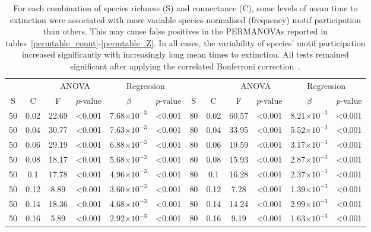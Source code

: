 \documentclass[12pt]{article}
\begin{document}
		\begin{table}[hb!]
			\caption{For each combination of species richness (S) and connectance (C), some levels of mean time to extinction were associated with more variable species-normalised (frequency) motif participation than others. This may cause false positives in the PERMANOVAs reported in tables~\ref{permtable_count}-\ref{permtable_Z}. In all cases, the variability of species' motif participation increased significantly with increasingly long mean times to extinction. All tests remained significant after applying the correlated Bonferroni correction~\citep{Drezner2016}.}
			\label{betadisp_freq}
			\footnotesize
			\begin{tabular}{c c | c c| c c ||c c | c c | c c |}
        &&\multicolumn{2}{c|}{ANOVA}&\multicolumn{2}{c||}{Regression}&&&\multicolumn{2}{c|}{ANOVA}&\multicolumn{2}{c|}{Regression}\\
        S&C&F&$p$-value&$\beta$&$p$-value&S&C&F&$p$-value&$\beta$&$p$-value\\
        \hline
        50  & 0.02  & 22.69 & \textless0.001  & 7.68$\times10^{-3}$ & \textless0.001  & 80  & 0.02  & 60.57 & \textless0.001  & 8.21$\times10^{-3}$ & \textless0.001  \\
        50  & 0.04  & 30.77 & \textless0.001  & 7.63$\times10^{-3}$ & \textless0.001  & 80  & 0.04  & 33.95 & \textless0.001  & 5.52$\times10^{-3}$ & \textless0.001  \\
        50  & 0.06  & 29.19 & \textless0.001  & 6.88$\times10^{-3}$ & \textless0.001  & 80  & 0.06  & 19.59 & \textless0.001  & 3.17$\times10^{-3}$ & \textless0.001  \\
        50  & 0.08  & 18.17 & \textless0.001  & 5.68$\times10^{-3}$ & \textless0.001  & 80  & 0.08  & 15.93 & \textless0.001  & 2.87$\times10^{-3}$ & \textless0.001  \\
        50  & 0.1 & 17.78 & \textless0.001  & 4.96$\times10^{-3}$ & \textless0.001  & 80  & 0.1 & 16.28 & \textless0.001  & 2.37$\times10^{-3}$ & \textless0.001  \\
        50  & 0.12  & 8.89  & \textless0.001  & 3.60$\times10^{-3}$ & \textless0.001  & 80  & 0.12  & 7.28  & \textless0.001  & 1.39$\times10^{-3}$ & \textless0.001  \\
        50  & 0.14  & 18.36 & \textless0.001  & 4.68$\times10^{-3}$ & \textless0.001  & 80  & 0.14  & 14.24 & \textless0.001  & 2.99$\times10^{-3}$ & \textless0.001  \\
        50  & 0.16  & 5.89  & \textless0.001  & 2.92$\times10^{-3}$ & \textless0.001  & 80  & 0.16  & 9.19  & \textless0.001  & 1.63$\times10^{-3}$ & \textless0.001  \\

\end{tabular}
\end{table}
\end{document}
